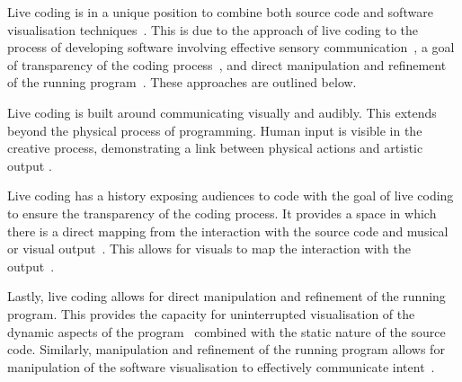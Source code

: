 
Live coding is in a unique position to combine both source code and software visualisation techniques~\cite{McLean2010a}. This is due to the approach of live coding to the process of developing software involving effective sensory communication~, a goal of transparency of the coding process~\cite{Collins2011,McLean2010a}, and direct manipulation and refinement of the running program~\cite{Swift2013}. These approaches are outlined below.

Live coding is built around communicating visually and audibly. This extends beyond the physical process of programming. Human input is visible in the creative process, demonstrating a link between physical actions and artistic output \cite{Mclean}.

Live coding has a history exposing audiences to code with the goal of live coding to ensure the transparency of the coding process. It provides a space in which there is a direct mapping from the interaction with the source code and musical or visual output~. This allows for visuals to map the interaction with the output~.

Lastly, live coding allows for direct manipulation and refinement of the running program. This provides the capacity for uninterrupted visualisation of the dynamic aspects of the program~ combined with the static nature of the source code. Similarly, manipulation and refinement of the running program allows for manipulation of the software visualisation to effectively communicate intent~.




